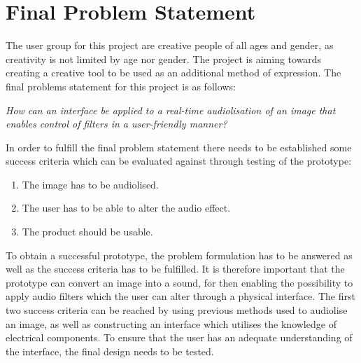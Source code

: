 \chapter{Final Problem Statement}\label{ch:finalproblem}

The user group for this project are creative people of all ages and gender, as creativity is not limited by age nor gender. The project is aiming towards creating a creative tool to be used as an additional method of expression. 
The final problems statement for this project is as follows:



\textit{How can an interface be applied to a real-time audiolisation of an image that enables control of filters in a user-friendly manner?}



In order to fulfill the final problem statement there needs to be established some success criteria which can be evaluated against through testing of the prototype: 
\begin{enumerate}
\item The image has to be audiolised. 
\item The user has to be able to alter the audio effect. 
\item The product should be usable.
\end{enumerate}

To obtain a successful prototype, the problem formulation has to be answered as well as the success criteria has to be fulfilled. It is therefore important that the prototype can convert an image into a sound, for then enabling the possibility to apply audio filters which the user can alter through a physical interface. The first two success criteria can be reached by using previous methods used to audiolise an image, as well as constructing an interface which utilises the knowledge of electrical components.
To ensure that the user has an adequate understanding of the interface, the final design needs to be tested.